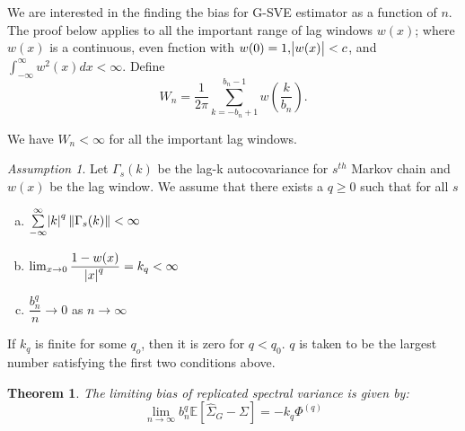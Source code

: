 \documentclass[11pt]{article}
\newtheorem{theorem}{Theorem}
\theoremstyle{remark}
\newtheorem{ass}{Assumption}
\begin{document}

We are interested in the finding the bias for G-SVE estimator as a function of $n$. The proof below applies to all the important range of lag windows $w(x)$; where $w(x)$ is a continuous, even fnction with $w(0)=1, \abs{w(x)} < c$, and $\int_{-\infty}^{\infty}w^2(x)dx < \infty$. Define
%
\[
W_n = \dfrac{1}{2\pi}\sum_{k=-b_n+1}^{b_n-1}w\left(\dfrac{k}{b_n}\right).
\]

We have $W_n < \infty$ for all the important lag windows.

\begin{ass} \label{ass:bias}
    Let $\Gamma_s(k)$ be the lag-k autocovariance for $s^{th}$ Markov chain and $w(x)$ be the lag window. We assume that there exists a $q \geq 0$ such that for all $s$
    \begin{enumerate} [a.]
        \item $\sum\limits_{-\infty}^{\infty}\abs{k}^q \|\Gamma_s(k)\| < \infty$
        \item $\lim _{x \to 0}\dfrac{1 - w(x)}{\abs{x}^q} = k_q < \infty$
        \item $\dfrac{b_n^q}{n} \to 0$ as $n \to \infty$
    \end{enumerate}
    
    If $k_q$ is finite for some $q_o$, then it is zero for $q < q_0$. $q$ is taken to be the largest number satisfying the first two conditions above.
\end{ass}


\begin{theorem}\label{th:G-SVE_bias}
The limiting bias of replicated spectral variance is given by:
\[
 \lim_{n \to \infty}b_n^q\mathbb{E} \left[\hat{\Sigma}_{G} - \Sigma \right] = -k_q\Phi^{(q)}
 \]
\end{theorem}


\end{document}
